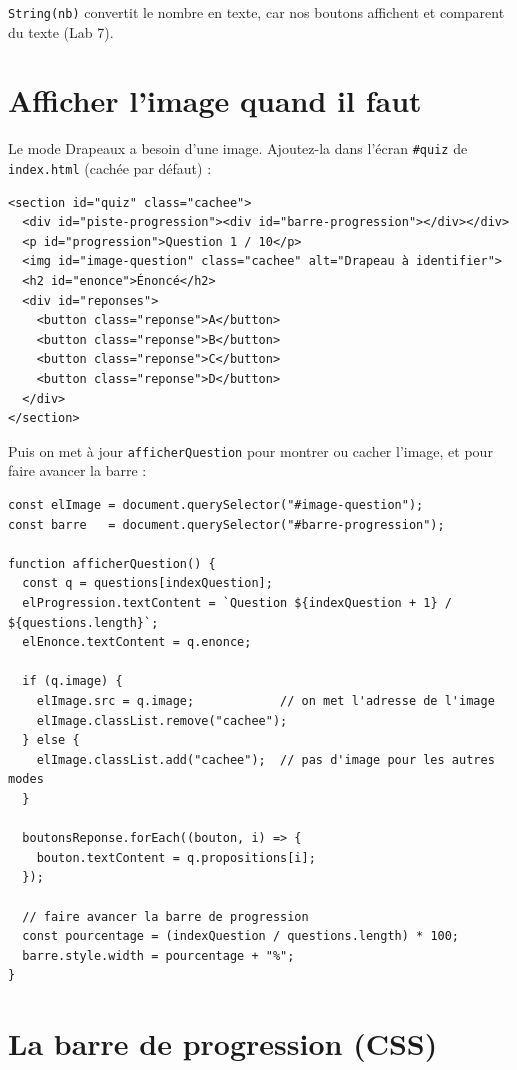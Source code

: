 \documentclass[11pt,a4paper]{article}
\newcommand{\code}[1]{\texttt{#1}}
\begin{document}
\code{String(nb)} convertit le nombre en texte, car nos boutons affichent et comparent du texte (Lab 7).

\section{Afficher l'image quand il faut}

Le mode Drapeaux a besoin d'une image. Ajoutez-la dans l'écran \code{\#quiz} de \code{index.html} (cachée par défaut) :

\begin{lstlisting}[style=html]
<section id="quiz" class="cachee">
  <div id="piste-progression"><div id="barre-progression"></div></div>
  <p id="progression">Question 1 / 10</p>
  <img id="image-question" class="cachee" alt="Drapeau à identifier">
  <h2 id="enonce">Énoncé</h2>
  <div id="reponses">
    <button class="reponse">A</button>
    <button class="reponse">B</button>
    <button class="reponse">C</button>
    <button class="reponse">D</button>
  </div>
</section>
\end{lstlisting}

Puis on met à jour \code{afficherQuestion} pour montrer ou cacher l'image, et pour faire avancer la barre :

\begin{lstlisting}[style=js]
const elImage = document.querySelector("#image-question");
const barre   = document.querySelector("#barre-progression");

function afficherQuestion() {
  const q = questions[indexQuestion];
  elProgression.textContent = `Question ${indexQuestion + 1} / ${questions.length}`;
  elEnonce.textContent = q.enonce;

  if (q.image) {
    elImage.src = q.image;            // on met l'adresse de l'image
    elImage.classList.remove("cachee");
  } else {
    elImage.classList.add("cachee");  // pas d'image pour les autres modes
  }

  boutonsReponse.forEach((bouton, i) => {
    bouton.textContent = q.propositions[i];
  });

  // faire avancer la barre de progression
  const pourcentage = (indexQuestion / questions.length) * 100;
  barre.style.width = pourcentage + "%";
}
\end{lstlisting}

\section{La barre de progression (CSS)}
\end{document}
